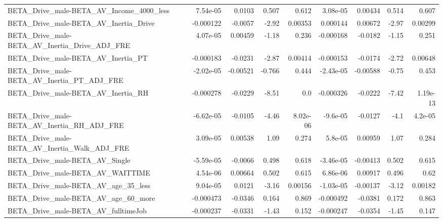 \begin{tabular}{lrrrrrrrr}
BETA\_Drive\_male-BETA\_AV\_Income\_4000\_less           &    7.54e-05 &       0.0103 &    0.507 &    0.612 &   3.08e-05 &     0.00434 &        0.514 &         0.607 \\
BETA\_Drive\_male-BETA\_AV\_Inertia\_Drive              &   -0.000122 &      -0.0057 &    -2.92 &  0.00353 &   0.000144 &     0.00672 &        -2.97 &       0.00299 \\
BETA\_Drive\_male-BETA\_AV\_Inertia\_Drive\_ADJ\_FRE      &    4.07e-05 &      0.00459 &    -1.18 &    0.236 &  -0.000168 &     -0.0182 &        -1.15 &         0.251 \\
BETA\_Drive\_male-BETA\_AV\_Inertia\_PT                 &   -0.000183 &      -0.0231 &    -2.87 &  0.00414 &  -0.000153 &     -0.0174 &        -2.72 &       0.00648 \\
BETA\_Drive\_male-BETA\_AV\_Inertia\_PT\_ADJ\_FRE         &   -2.02e-05 &     -0.00521 &   -0.766 &    0.444 &  -2.43e-05 &    -0.00588 &        -0.75 &         0.453 \\
BETA\_Drive\_male-BETA\_AV\_Inertia\_RH                 &   -0.000278 &      -0.0229 &    -8.51 &      0.0 &  -0.000326 &     -0.0222 &        -7.42 &      1.19e-13 \\
BETA\_Drive\_male-BETA\_AV\_Inertia\_RH\_ADJ\_FRE         &   -6.62e-05 &      -0.0105 &    -4.46 & 8.02e-06 &   -9.6e-05 &     -0.0127 &         -4.1 &       4.2e-05 \\
BETA\_Drive\_male-BETA\_AV\_Inertia\_Walk\_ADJ\_FRE       &    3.09e-05 &      0.00538 &     1.09 &    0.274 &    5.8e-05 &     0.00959 &         1.07 &         0.284 \\
BETA\_Drive\_male-BETA\_AV\_Single                     &   -5.59e-05 &      -0.0066 &    0.498 &    0.618 &  -3.46e-05 &    -0.00413 &        0.502 &         0.615 \\
BETA\_Drive\_male-BETA\_AV\_WAITTIME                   &    4.54e-06 &      0.00664 &    0.502 &    0.615 &   6.86e-06 &     0.00917 &        0.496 &          0.62 \\
BETA\_Drive\_male-BETA\_AV\_age\_35\_less                &    9.04e-05 &       0.0121 &    -3.16 &  0.00156 &  -1.03e-05 &    -0.00137 &        -3.12 &       0.00182 \\
BETA\_Drive\_male-BETA\_AV\_age\_60\_more                &   -0.000473 &      -0.0346 &    0.164 &    0.869 &  -0.000492 &     -0.0381 &        0.172 &         0.863 \\
BETA\_Drive\_male-BETA\_AV\_fulltimeJob                &   -0.000237 &      -0.0331 &    -1.43 &    0.152 &  -0.000247 &     -0.0354 &        -1.45 &         0.147 \\

\end{tabular}
